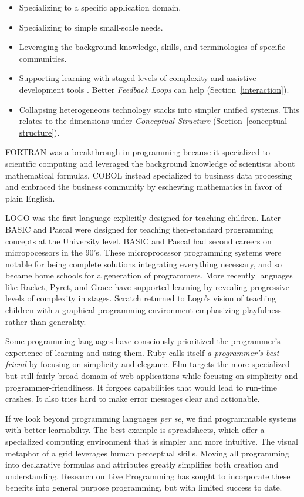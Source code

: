 \documentclass[english,submission]{programming}
\begin{document}
\begin{itemize}
\tightlist
\item
  Specializing to a specific application domain.
\item
  Specializing to simple small-scale needs.
\item
  Leveraging the background knowledge, skills, and terminologies of
  specific communities.
\item
  Supporting learning with staged levels of complexity and assistive
  development tools \cite{FullBrain}. Better \emph{Feedback Loops} can
  help (Section~\ref{interaction}).
\item
  Collapsing heterogeneous technology stacks into simpler unified
  systems. This relates to the dimensions under \emph{Conceptual
  Structure} (Section~\ref{conceptual-structure}).
\end{itemize}

FORTRAN was a breakthrough in programming because it specialized to
scientific computing and leveraged the background knowledge of
scientists about mathematical formulas. COBOL instead specialized to
business data processing and embraced the business community by
eschewing mathematics in favor of plain English.

LOGO was the first language explicitly designed for teaching children.
Later BASIC and Pascal were designed for teaching then-standard
programming concepts at the University level. BASIC and Pascal had
second careers on micropocessors in the 90's. These microprocessor
programming systems were notable for being complete solutions
integrating everything necessary, and so became home schools for a
generation of programmers. More recently languages like Racket, Pyret,
and Grace have supported learning by revealing progressive levels of
complexity in stages. Scratch returned to Logo's vision of teaching
children with a graphical programming environment emphasizing
playfulness rather than generality.

Some programming languages have consciously prioritized the programmer's
experience of learning and using them. Ruby calls itself \emph{a
programmer's best friend} by focusing on simplicity and elegance. Elm
targets the more specialized but still fairly broad domain of web
applications while focusing on simplicity and programmer-friendliness.
It forgoes capabilities that would lead to run-time crashes. It also
tries hard to make error messages clear and actionable.

If we look beyond programming languages \emph{per se}, we find
programmable systems with better learnability. The best example is
spreadsheets, which offer a specialized computing environment that is
simpler and more intuitive. The visual metaphor of a grid leverages
human perceptual skills. Moving all programming into declarative
formulas and attributes greatly simplifies both creation and
understanding. Research on Live Programming
\cite{Hancock2003,BretVictor} has sought to incorporate these benefits
into general purpose programming, but with limited success to date.
\end{document}
